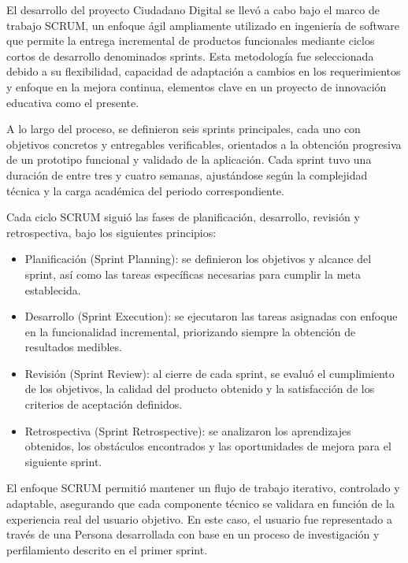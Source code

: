El desarrollo del proyecto Ciudadano Digital se llevó a cabo bajo el marco de
trabajo SCRUM, un enfoque ágil ampliamente utilizado en ingeniería de software
que permite la entrega incremental de productos funcionales mediante ciclos
cortos de desarrollo denominados sprints. Esta metodología fue seleccionada
debido a su flexibilidad, capacidad de adaptación a cambios en los
requerimientos y enfoque en la mejora continua, elementos clave en un proyecto
de innovación educativa como el presente.

A lo largo del proceso, se definieron seis sprints principales, cada uno con
objetivos concretos y entregables verificables, orientados a la obtención
progresiva de un prototipo funcional y validado de la aplicación. Cada sprint
tuvo una duración de entre tres y cuatro semanas, ajustándose según la
complejidad técnica y la carga académica del periodo correspondiente.

Cada ciclo SCRUM siguió las fases de planificación, desarrollo, revisión y
retrospectiva, bajo los siguientes principios:

\begin{itemize}
      \item Planificación (Sprint Planning): se definieron los objetivos y alcance del
            sprint, así como las tareas específicas necesarias para cumplir la meta
            establecida.
      \item Desarrollo (Sprint Execution): se ejecutaron las tareas asignadas con enfoque
            en la funcionalidad incremental, priorizando siempre la obtención de resultados
            medibles.
      \item Revisión (Sprint Review): al cierre de cada sprint, se evaluó el cumplimiento
            de los objetivos, la calidad del producto obtenido y la satisfacción de los
            criterios de aceptación definidos.
      \item Retrospectiva (Sprint Retrospective): se analizaron los aprendizajes obtenidos,
            los obstáculos encontrados y las oportunidades de mejora para el siguiente
            sprint.
\end{itemize}

El enfoque SCRUM permitió mantener un flujo de trabajo iterativo, controlado y
adaptable, asegurando que cada componente técnico se validara en función de la
experiencia real del usuario objetivo. En este caso, el usuario fue
representado a través de una Persona desarrollada con base en un proceso de
investigación y perfilamiento descrito en el primer sprint.

